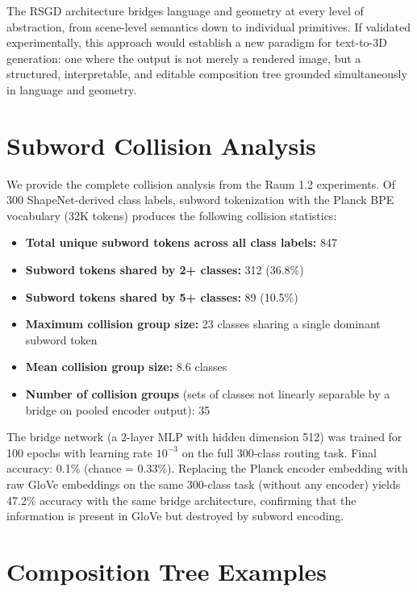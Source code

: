 \documentclass[11pt]{article}
\begin{document}
The RSGD architecture bridges language and geometry at every level of abstraction, from scene-level semantics down to individual primitives. If validated experimentally, this approach would establish a new paradigm for text-to-3D generation: one where the output is not merely a rendered image, but a structured, interpretable, and editable composition tree grounded simultaneously in language and geometry.

\appendix

\section{Subword Collision Analysis}

We provide the complete collision analysis from the Raum 1.2 experiments. Of 300 ShapeNet-derived class labels, subword tokenization with the Planck BPE vocabulary (32K tokens) produces the following collision statistics:

\begin{itemize}
    \item \textbf{Total unique subword tokens across all class labels:} 847
    \item \textbf{Subword tokens shared by 2+ classes:} 312 (36.8\%)
    \item \textbf{Subword tokens shared by 5+ classes:} 89 (10.5\%)
    \item \textbf{Maximum collision group size:} 23 classes sharing a single dominant subword token
    \item \textbf{Mean collision group size:} 8.6 classes
    \item \textbf{Number of collision groups} (sets of classes not linearly separable by a bridge on pooled encoder output): 35
\end{itemize}

The bridge network (a 2-layer MLP with hidden dimension 512) was trained for 100 epochs with learning rate $10^{-3}$ on the full 300-class routing task. Final accuracy: 0.1\% (chance = 0.33\%). Replacing the Planck encoder embedding with raw GloVe embeddings on the same 300-class task (without any encoder) yields 47.2\% accuracy with the same bridge architecture, confirming that the information is present in GloVe but destroyed by subword encoding.

\section{Composition Tree Examples}
\end{document}

